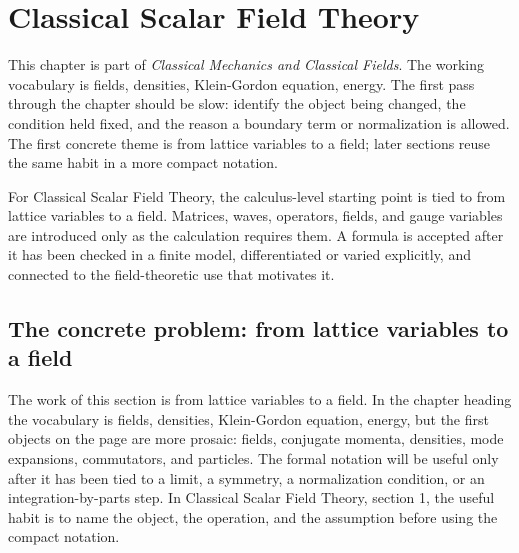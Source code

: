 \chapter{Classical Scalar Field Theory}


This chapter is part of \emph{Classical Mechanics and Classical Fields}.  The working vocabulary is fields, densities, Klein-Gordon equation, energy.  The first pass through the chapter should be slow: identify the object being changed, the condition held fixed, and the reason a boundary term or normalization is allowed.  The first concrete theme is from lattice variables to a field; later sections reuse the same habit in a more compact notation.

For Classical Scalar Field Theory, the calculus-level starting point is tied to from lattice variables to a field.  Matrices, waves, operators, fields, and gauge variables are introduced only as the calculation requires them.  A formula is accepted after it has been checked in a finite model, differentiated or varied explicitly, and connected to the field-theoretic use that motivates it.

\section{The concrete problem: from lattice variables to a field}













The work of this section is from lattice variables to a field.  In the chapter heading the vocabulary is fields, densities, Klein-Gordon equation, energy, but the first objects on the page are more prosaic: fields, conjugate momenta, densities, mode expansions, commutators, and particles.  The formal notation will be useful only after it has been tied to a limit, a symmetry, a normalization condition, or an integration-by-parts step.  In Classical Scalar Field Theory, section 1, the useful habit is to name the object, the operation, and the assumption before using the compact notation.

